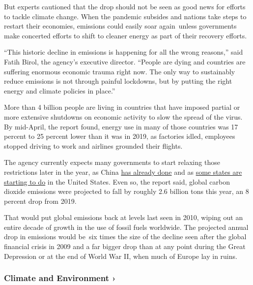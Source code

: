 But experts cautioned that the drop should not be seen as good news for
efforts to tackle climate change. When the pandemic subsides and nations
take steps to restart their economies, emissions could easily soar
again~unless governments make concerted efforts to shift to cleaner
energy as part of their recovery efforts.

``This historic decline in emissions is happening for all the wrong
reasons,'' said Fatih Birol, the agency's executive director. ``People
are dying and countries are suffering enormous economic trauma right
now. The only way to sustainably reduce emissions is not through painful
lockdowns, but by putting the right energy and climate policies in
place.''

More than 4 billion people are living in countries that have imposed
partial or more extensive shutdowns on economic activity to slow the
spread of the virus. By mid-April, the report found, energy use in many
of those countries was 17 percent to 25 percent lower than it was in
2019, as factories idled, employees stopped driving to work and airlines
grounded their flights.

The agency currently expects many governments to start relaxing those
restrictions later in the year, as China
\href{https://www.nytimes3xbfgragh.onion/2020/03/24/world/asia/china-coronavirus-lockdown-hubei.html}{has
already done} and as
\href{https://www.nytimes3xbfgragh.onion/2020/04/27/us/coronavirus-governors-states-reopening.html}{some
states are starting to do} in the United States. Even so, the report
said, global carbon dioxide emissions were projected to fall by roughly
2.6 billion tons this year, an 8 percent drop from 2019.

That would put global emissions back at levels last seen in 2010, wiping
out an entire decade of growth in the use of fossil fuels worldwide. The
projected annual drop in emissions would be~six times the size of the
decline seen after the global financial crisis in 2009 and a far bigger
drop than at any point during the Great Depression or at the end of
World War II, when much of Europe lay in ruins.

\href{\%3Ca\%20href=\%22https://www.nytimes3xbfgragh.onion/section/climate?action=click\&pgtype=Article\&state=default\&region=MAIN_CONTENT_1\&context=storylines_keepup\%22\%3Ehttps://www.nytimes3xbfgragh.onion/section/climate?action=click\&pgtype=Article\&state=default\&region=MAIN_CONTENT_1\&context=storylines_keepup\%3C/a\%3E}{}

\hypertarget{climate-and-environment-}{%
\subsubsection{Climate and Environment
›}\label{climate-and-environment-}}

